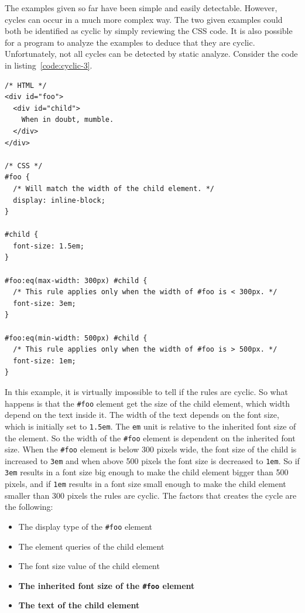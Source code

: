 \documentclass[a4paper,11pt]{kth-mag}
\newcommand{\code}[1]{\texttt{#1}}
\begin{document}
          The examples given so far have been simple and easily detectable.
          However, cycles can occur in a much more complex way.
          The two given examples could both be identified as cyclic by simply reviewing the \gls{CSS} code.
          It is also possible for a program to analyze the examples to deduce that they are cyclic.
          Unfortunately, not all cycles can be detected by static analyze.
          Consider the code in listing~\ref{code:cyclic-3}.
          \begin{lstlisting}[caption={Example of indirect cyclic rules.}, captionpos=b, label={code:cyclic-3}]
/* HTML */
<div id="foo">
  <div id="child">
    When in doubt, mumble.
  </div>
</div>

/* CSS */
#foo {
  /* Will match the width of the child element. */
  display: inline-block;
}

#child {
  font-size: 1.5em;
}

#foo:eq(max-width: 300px) #child {
  /* This rule applies only when the width of #foo is < 300px. */
  font-size: 3em;
}

#foo:eq(min-width: 500px) #child { 
  /* This rule applies only when the width of #foo is > 500px. */
  font-size: 1em;
}
          \end{lstlisting}
          In this example, it is virtually impossible to tell if the rules are cyclic.
          So what happens is that the \code{\#foo} \gls{element} get the size of the child \gls{element}, which width depend on the text inside it.
          The width of the text depends on the font size, which is initially set to \code{1.5em}.
          The \code{em} unit is relative to the inherited font size of the \gls{element}.
          So the width of the \code{\#foo} \gls{element} is dependent on the inherited font size.
          When the \code{\#foo} \gls{element} is below 300 pixels wide, the font size of the child is increased to \code{3em} and when above 500 pixels the font size is decreased to \code{1em}.
          So if \code{3em} results in a font size big enough to make the child \gls{element} bigger than 500 pixels, and if \code{1em} results in a font size small enough to make the child \gls{element} smaller than 300 pixels the rules are cyclic.
          The factors that creates the cycle are the following:
          \begin{itemize}
            \item The display type of the \code{\#foo} \gls{element}
            \item The \gls{element} queries of the child \gls{element}
            \item The font size value of the child \gls{element}
            \item \textbf{The inherited font size of the \code{\#foo} \gls{element}}
            \item \textbf{The text of the child \gls{element}}
          \end{itemize}
\end{document}
